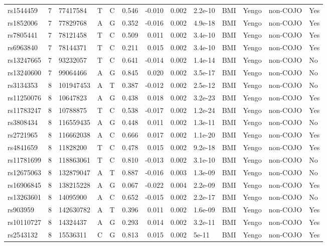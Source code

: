 \documentclass[11pt,twoside]{bristolthesis}
\begin{document}
\begin{longtable}[t]{lrlllrrrlllll}
rs1544459 & 7 & 77417584 & T & C & 0.546 & -0.010 & 0.002 & 2.2e-10 & BMI & Yengo & non-COJO & Yes\\
rs1852006 & 7 & 77829768 & A & G & 0.352 & -0.016 & 0.002 & 4.9e-18 & BMI & Yengo & non-COJO & Yes\\
rs7805441 & 7 & 78121458 & T & C & 0.509 & 0.011 & 0.002 & 3.4e-10 & BMI & Yengo & non-COJO & Yes\\
rs6963840 & 7 & 78144371 & T & C & 0.211 & 0.015 & 0.002 & 3.4e-10 & BMI & Yengo & non-COJO & Yes\\
\addlinespace
rs13247665 & 7 & 93232057 & T & C & 0.641 & -0.014 & 0.002 & 1.4e-14 & BMI & Yengo & non-COJO & No\\
rs13240600 & 7 & 99064466 & A & G & 0.845 & 0.020 & 0.002 & 3.5e-17 & BMI & Yengo & non-COJO & No\\
rs3134353 & 8 & 101947453 & A & T & 0.387 & -0.012 & 0.002 & 2.5e-12 & BMI & Yengo & non-COJO & No\\
rs11250076 & 8 & 10647823 & A & G & 0.438 & 0.018 & 0.002 & 3.2e-23 & BMI & Yengo & non-COJO & Yes\\
rs11783247 & 8 & 10788875 & T & C & 0.538 & -0.017 & 0.002 & 1.2e-24 & BMI & Yengo & non-COJO & Yes\\
\addlinespace
rs3808434 & 8 & 116559435 & A & G & 0.448 & 0.011 & 0.002 & 1.3e-11 & BMI & Yengo & non-COJO & No\\
rs2721965 & 8 & 116662038 & A & C & 0.666 & 0.017 & 0.002 & 1.1e-20 & BMI & Yengo & non-COJO & Yes\\
rs4841659 & 8 & 11828200 & T & C & 0.478 & 0.015 & 0.002 & 9.2e-18 & BMI & Yengo & non-COJO & Yes\\
rs11781699 & 8 & 118863061 & T & C & 0.810 & -0.013 & 0.002 & 3.1e-10 & BMI & Yengo & non-COJO & No\\
rs12675063 & 8 & 132879047 & A & T & 0.887 & -0.016 & 0.003 & 1.3e-09 & BMI & Yengo & non-COJO & No\\
\addlinespace
rs16906845 & 8 & 138215228 & A & G & 0.067 & -0.022 & 0.004 & 2.2e-09 & BMI & Yengo & non-COJO & Yes\\
rs13263601 & 8 & 14095900 & A & C & 0.652 & -0.015 & 0.002 & 2.2e-17 & BMI & Yengo & non-COJO & No\\
rs903959 & 8 & 142630782 & A & T & 0.396 & 0.011 & 0.002 & 1.6e-09 & BMI & Yengo & non-COJO & Yes\\
rs10110727 & 8 & 14324437 & A & G & 0.293 & 0.014 & 0.002 & 3.2e-11 & BMI & Yengo & non-COJO & Yes\\
rs2543132 & 8 & 15536311 & C & G & 0.813 & 0.015 & 0.002 & 5e-11 & BMI & Yengo & non-COJO & Yes\\

\end{longtable}
\end{document}
